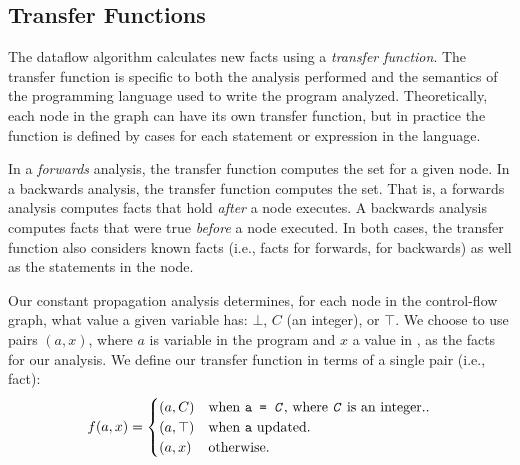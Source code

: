 \documentclass[12pt]{report}
\begin{document}




\subsection{Transfer Functions}
\label{back_subsec_transfer}

The dataflow algorithm calculates new facts using a \emph{transfer
  function}. The transfer function is specific to both the analysis
performed and the semantics of the programming language used to write
the program analyzed. Theoretically, each node in the graph can
have its own transfer function, but in practice the function is 
defined by cases for each statement or expression in the language. 

In a \emph{forwards} analysis, the transfer function computes the \out
set for a given node. In a backwards analysis, the transfer function
computes the \inE set. That is, a forwards analysis computes facts
that hold \emph{after} a node executes. A backwards analysis computes
facts that were true \emph{before} a node executed.  In both cases,
the transfer function also considers known facts (i.e., \inE facts for
forwards, \out for backwards) as well as the statements in the node.

Our constant propagation analysis determines, for each node in the
control-flow graph, what value a given variable has: $\bot$, $C$ (an
integer), or $\top$. We choose to use pairs $(a,x)$, where $a$ is
variable in the program and $x$ a value in \setLC, as the facts for
our analysis. We define our transfer function in terms of a single 
pair (i.e., fact):
\begin{equation}
  f (a,x) = 
  \begin{cases}
    (a,C) & \text{when \texttt{a = \emph{C}}, where \texttt{\emph{C}} is an integer.}. \\
    (a,\top) & \text{when \texttt{a} updated}. \\
    (a,x) & \text{otherwise}. \\
  \end{cases}
  \label{eqn_back4}
\end{equation}
\end{document}
